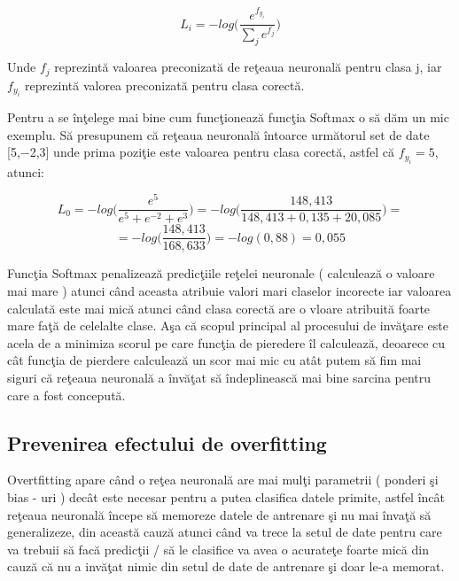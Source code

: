 $$ L_i = - log \bigg(\frac{e^{f_y_i}}{\sum_j e^{f_j}}\bigg)$$

Unde $f_j$ reprezint\u{a} valoarea preconizat\u{a} de re\c{t}eaua neuronal\u{a} pentru clasa j, iar $f_y_i$ reprezint\u{a} valorea preconizat\u{a} pentru clasa corect\u{a}.

\par

Pentru a se \^{i}n\c{t}elege mai bine cum func\c{t}ioneaz\u{a} func\c{t}ia Softmax o s\u{a} d\u{a}m un mic exemplu. S\u{a} presupunem c\u{a} re\c{t}eaua neuronal\u{a} \^{i}ntoarce urm\u{a}torul set de date [5,−2,3] unde prima pozi\c{t}ie este valoarea pentru clasa corect\u{a}, astfel c\u{a} $f_y_i = 5$, atunci:

$$L_0 = - log \bigg(\frac{e^{5}}{e^{5} + e^{-2} + e^{3}} \bigg) = - log \bigg(\frac{148,413}{148,413 + 0,135 + 20,085}\bigg) =  $$
$$ = - log\bigg( \frac{148,413}{168,633} \bigg) = -log(0,88) = 0,055 $$

Func\c{t}ia Softmax penalizeaz\u{a} predic\c{t}iile re\c{t}elei neuronale ( calculeaz\u{a} o valoare mai mare ) atunci c\^{a}nd aceasta atribuie valori mari claselor incorecte iar valoarea calculat\u{a} este mai mic\u{a} atunci c\^{a}nd clasa corect\u{a} are o vloare atribuit\u{a} foarte mare fa\c{t}\u{a} de celelalte clase. A\c{s}a c\u{a} scopul principal al procesului de inv\u{a}\c{t}are este acela de a minimiza scorul pe care func\c{t}ia de pieredere \^{i}l calculeaz\u{a}, deoarece cu c\^{a}t func\c{t}ia de pierdere calculeaz\u{a} un scor mai mic cu at\^{a}t putem s\u{a} fim mai siguri c\u{a} re\c{t}eaua neuronal\u{a} a \^{i}nv\u{a}\c{t}at s\u{a} \^{i}ndeplineasc\u{a} mai bine sarcina pentru care a fost conceput\u{a}.

\subsection{Prevenirea efectului de overfitting}

Overtfitting apare c\^{a}nd o re\c{t}ea neuronal\u{a} are mai mul\c{t}i parametrii ( ponderi \c{s}i bias - uri ) dec\^{a}t este necesar pentru a putea clasifica datele primite, astfel \^{i}nc\^{a}t re\c{t}eaua neuronal\u{a} \^{i}ncepe s\u{a} memoreze datele de antrenare \c{s}i nu mai \^{i}nva\c{t}\u{a} s\u{a} generalizeze, din aceast\u{a} cauz\u{a} atunci c\^{a}nd va trece la setul de date pentru care va trebuii s\u{a} fac\u{a} predic\c{t}ii / s\u{a} le clasifice va avea o acurate\c{t}e foarte mic\u{a} din cauz\u{a} c\u{a} nu a inv\u{a}\c{t}at nimic din setul de date de antrenare \c{s}i doar le-a memorat.

